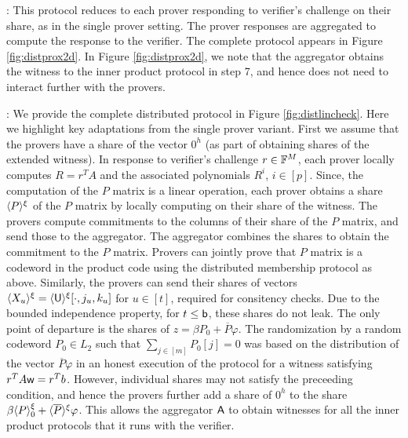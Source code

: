 : 
This protocol reduces to each prover responding to verifier’s
challenge on their share, as in the single    prover setting. The prover
responses are aggregated to compute the response to    the verifier. The
complete protocol appears in Figure \ref{fig:distprox2d}. In Figure
\ref{fig:distprox2d}, we note that the aggregator obtains the witness to the
inner product protocol in step 7, and hence does not need to interact further
with the provers. 

: We provide the
complete distributed protocol in Figure \ref{fig:distlincheck}. Here we
highlight key adaptations from the single prover variant. First we assume
that the provers have a share of the vector $0^h$ (as part of obtaining
shares of the extended witness). In response to verifier’s challenge $r\in
\mathbb{F}^M$, each prover locally computes $R=r^TA$ and the associated polynomials
$R^i$, $i\in [p]$. Since, the computation of the $P$ matrix is a linear
operation, each prover obtains a share $\langle{P}\rangle^\xi$ of the $P$ matrix by locally
computing on their share of the witness. The provers compute commitments to the
columns of their share of the $P$ matrix, and send those to the aggregator. The
aggregator combines the shares to obtain the commitment to the $P$ matrix.
Provers can jointly prove that $P$ matrix is a codeword in the product code
using the distributed membership protocol as above. Similarly, the provers can
send their shares of vectors $\langle{X_u}\rangle^\xi=\langle{\mathsf{U}}\rangle^\xi[\cdot,j_u,k_u]$ for $u\in
[t]$, required for consitency    checks. Due to the bounded independence
property, for $t\leq \mathsf{b}$, these shares    do not leak. The only point of
departure is the shares of $z=\beta P_0 + \overline{P}\varphi$. The
randomization by a random codeword $P_0\in L_2$ such that $\sum_{j\in [m]}
P_0[j]=0$ was based on the distribution of the vector $\overline{P}\varphi$
in an honest execution of the protocol for a witness satisfying
$r^TA\mathsf{w}=r^Tb$. However, individual shares may not satisfy the preceeding
condition, and hence the provers further add a share of $0^h$ to the share
$\beta\langle{P}\rangle^\xi_0 + \langle{\overline{P}}\rangle^\xi\varphi$. This allows the aggregator $\mathsf{A}$
to obtain witnesses for all the inner product protocols that it runs with the
verifier.  

